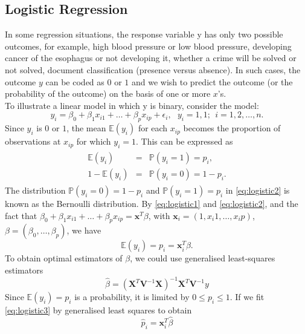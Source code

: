 \documentclass[a4paper,12pt,openany]{report}
\theoremstyle{plain}
\theoremstyle{plain}
\theoremstyle{plain}
\theoremstyle{plain}
\theoremstyle{plain}
\theoremstyle{plain}
\theoremstyle{plain}
\theoremstyle{plain}
\theoremstyle{plain}
\theoremstyle{plain}
\theoremstyle{plain}
\theoremstyle{plain}
\begin{document}
\subsection{Logistic Regression}
In some regression situations, the response variable y has only two possible outcomes, for example, high blood pressure or low blood pressure, developing cancer
of the esophagus or not developing it, whether a crime will be solved or not
solved, document classification (presence versus absence). In such cases, the outcome $y$ can be coded as $0$ or $1$ and we wish to
predict the outcome (or the probability of the outcome) on the basis of one or
more $x$'s.\\

To illustrate a linear model in which y is binary, consider the model:
\begin{equation}\label{eq:logistic1}
y_i = \beta_0+\beta_1x_{i1}+\ldots+\beta_px_{ip} + \epsilon_{i}, \ \ \ y_i=1,1; \ \ i=1,2,\ldots,n.
\end{equation}
Since $y_i$ is $0$ or $1$, the mean $\mathbb{E}(y_i)$ for each $x_{ip}$ becomes the proportion of observations at
$x_{ip}$ for which $y_i = 1$. This can be expressed as
\begin{eqnarray}\label{eq:logistic2}
\begin{array}{lcl}
\mathbb{E}(y_i)& = &\mathbb{P}(y_i=1)=p_i,\\
1-\mathbb{E}(y_i)& = &\mathbb{P}(y_i=0)= 1-p_i.
\end{array}
\end{eqnarray}
The distribution $\mathbb{P}(y_i=0)= 1-p_i$ and $\mathbb{P}(y_i=1)=p_i$ in \eqref{eq:logistic2} is known as the
Bernoulli distribution. By \eqref{eq:logistic1} and \eqref{eq:logistic2}, and the fact that $\beta_0+\beta_1x_{i1}+\ldots+\beta_px_{ip}=\mathbf{x}^T\beta$, with $\mathbf{x}_i=(1,x_i1,\ldots,x_ip)$, $\beta= (\beta_0,\ldots,\beta_p)$, we have
\begin{equation}\label{eq:logistic3}
\mathbb{E}(y_i) = p_i = \mathbf{x}_i^T\beta.
\end{equation}
To obtain optimal estimators of $\beta$, we could use generalised least-squares
estimators
\begin{equation}
\hat{\beta} = \left(\mathbf{X}^T\mathbf{V}^{-1}\mathbf{X}\right)^{-1}\mathbf{X}^T\mathbf{V}^{-1}y
\end{equation}
Since $\mathbb{E}(y_i)=p_i$ is a probability, it is limited by $0 \leq p_i\leq 1$. If we fit \eqref{eq:logistic3}
by generalised least squares to obtain
\begin{equation}
\hat{p}_i = \mathbf{x}_i^T\hat{\beta}
\end{equation}
\end{document}
